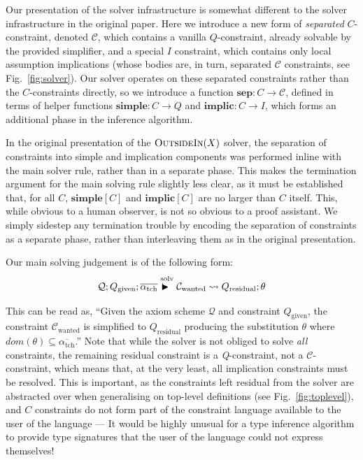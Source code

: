 \documentclass[a4paper]{jfp}
\newcommand{\outsidein}{\textsc{OutsideIn}(X)}
\begin{document}
Our presentation of the solver infrastructure is somewhat different to the solver infrastructure in the original paper.  Here we introduce a new form
of \emph{separated} $C$-constraint, denoted $\mathcal{C}$, which contains a vanilla $Q$-constraint, already solvable by the provided simplifier, and
a special $I$ constraint, which contains only local assumption implications (whose bodies are, in turn, separated $\mathcal{C}$ constraints, see
Fig.~\ref{fig:solver}). Our solver operates on these separated constraints rather than the $C$-constraints directly, so we introduce a function
$\textbf{sep} : C \rightarrow \mathcal{C}$, defined in terms of helper functions $\textbf{simple} : C \rightarrow Q$ and $\textbf{implic} : C
\rightarrow I$, which forms an additional phase in the inference algorithm.  

In the original presentation of the $\outsidein$ solver, the separation of constraints into simple and implication components was performed inline
with the main solver rule, rather than in a separate phase. This makes the termination argument for the main solving rule slightly less clear, as it
must be established that, for all $C$, $\textbf{simple}[C]$ and $\textbf{implic}[C]$ are no larger than $C$ itself. This, while obvious to a human
observer, is not so obvious to a proof assistant. We simply sidestep any termination trouble by encoding the separation of constraints as a separate
phase, rather than interleaving them as in the original presentation.

Our main solving judgement is of the following form:
\begin{displaymath}
\mathcal{Q};Q_{\text{given}}; \overline{\alpha_\text{tch}} \stackrel{\text{solv}}{\vdash\!\!\!\!\blacktriangleright\ }
\mathcal{C}_{\text{wanted}} \leadsto Q_{\text{residual}};\theta
\end{displaymath}

This can be read as, ``Given the axiom scheme $\mathcal{Q}$ and constraint
$Q_\text{given}$, the constraint $\mathcal{C}_{\text{wanted}}$ is simplified to $Q_{\text{residual}}$ producing the substitution $\theta$ where
$\mathit{dom}(\theta) \subseteq \overline{\alpha_\text{tch}}$.'' Note that while the solver is not obliged to solve \emph{all} constraints, the
remaining residual constraint is a \emph{Q}-constraint, not a $\mathcal{C}$-constraint, which means that, at the very least, all implication
constraints must be resolved. This is important, as the constraints left residual from the solver are abstracted over when generalising on top-level
definitions (see Fig.~\ref{fig:toplevel}), and $C$ constraints do not form part of the constraint language available to the user of the language ---
It would be highly unusual for a type inference algorithm to provide type signatures that the user of the language could not express themselves! 
\end{document}
